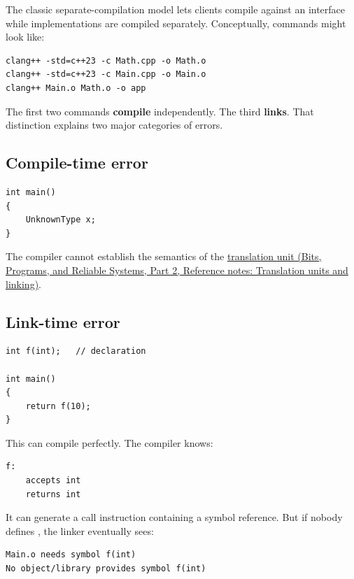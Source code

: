 The classic separate-compilation model lets clients compile against an interface while implementations are compiled separately. Conceptually, commands might look like:

\begin{verbatim}
clang++ -std=c++23 -c Math.cpp -o Math.o
clang++ -std=c++23 -c Main.cpp -o Main.o
clang++ Main.o Math.o -o app
\end{verbatim}

The first two commands \textbf{compile} independently. The third \textbf{links}. That distinction explains two major categories of errors.

\subsection{Compile-time error}\label{05-engine-i-ch002-compile-time-error}

\hypertarget{05-engine-i-ch002-compile-time-error}{}

\begin{verbatim}
int main()
{
    UnknownType x;
}
\end{verbatim}

The compiler cannot establish the semantics of the \href{../01-Bits-Programs-and-Reliable-Systems-P02/main.pdf\#nameddest=appendix-806686359e1b}{translation unit (Bits, Programs, and Reliable Systems, Part 2, Reference notes: Translation units and linking)}.

\subsection{Link-time error}\label{05-engine-i-ch002-link-time-error}

\hypertarget{05-engine-i-ch002-link-time-error}{}

\begin{verbatim}
int f(int);   // declaration

int main()
{
    return f(10);
}
\end{verbatim}

This can compile perfectly. The compiler knows:

\begin{verbatim}
f:
    accepts int
    returns int
\end{verbatim}

It can generate a call instruction containing a symbol reference. But if nobody defines , the linker eventually sees:

\begin{verbatim}
Main.o needs symbol f(int)
No object/library provides symbol f(int)
\end{verbatim}

